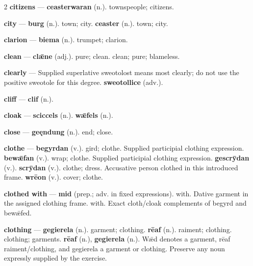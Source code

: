 \begin{multicols}{2}
\textbf{citizens} — \textbf{ceasterwaran} (n.). townspeople; citizens.\par
\textbf{city} — \textbf{burg} (n.). town; city. \textbf{ceaster} (n.). town; city.\par
\textbf{clarion} — \textbf{biema} (n.). trumpet; clarion.\par
\textbf{clean} — \textbf{clǣne} (adj.). pure; clean. clean; pure; blameless.\par
\textbf{clearly} — Supplied superlative sweotolost means most clearly; do not use the positive sweotole for this degree. \textbf{sweotollice} (adv.).\par
\textbf{cliff} — \textbf{clif} (n.).\par
\textbf{cloak} — \textbf{sciccels} (n.).  \textbf{wǣfels} (n.).\par
\textbf{close} — \textbf{geęndung} (n.). end; close.\par
\textbf{clothe} — \textbf{begyrdan} (v.). gird; clothe. Supplied participial clothing expression. \textbf{bewǣfan} (v.). wrap; clothe. Supplied participial clothing expression. \textbf{gescrȳdan} (v.).  \textbf{scrȳdan} (v.). clothe; dress. Accusative person clothed in this introduced frame. \textbf{wrēon} (v.). cover; clothe.\par
\textbf{clothed with} — \textbf{mid} (prep.; adv. in fixed expressions). with. Dative garment in the assigned clothing frame. with. Exact cloth/cloak complements of begyrd and bewǣfed.\par
\textbf{clothing} — \textbf{gegierela} (n.). garment; clothing. \textbf{rēaf} (n.). raiment; clothing. clothing; garments. \textbf{rēaf} (n.), \textbf{gegierela} (n.). Wǣd denotes a garment, rēaf raiment/clothing, and gegierela a garment or clothing. Preserve any noun expressly supplied by the exercise.\par

\end{multicols}
